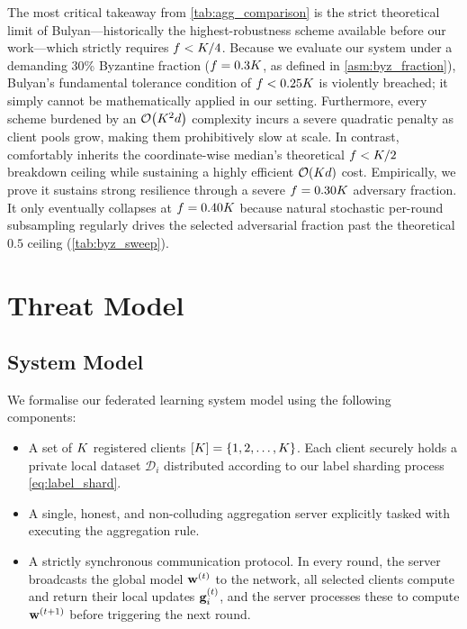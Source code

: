 \documentclass[../main]{subfiles}
\begin{document}
The most critical takeaway from \cref{tab:agg_comparison} is the strict theoretical limit of Bulyan---historically the highest-robustness scheme available before our work---which strictly requires $f < K/4$. Because we evaluate our system under a demanding 30\% Byzantine fraction ($f = 0.3K$, as defined in \cref{asm:byz_fraction}), Bulyan's fundamental tolerance condition of $f < 0.25K$ is violently breached; it simply cannot be mathematically applied in our setting. Furthermore, every scheme burdened by an $\mathcal{O}\!\left(K^2 d\right)$ complexity incurs a severe quadratic penalty as client pools grow, making them prohibitively slow at scale. In contrast, \aegis{} comfortably inherits the coordinate-wise median's theoretical $f < K/2$ breakdown ceiling while sustaining a highly efficient $\mathcal{O}\!\left(K d\right)$ cost. Empirically, we prove it sustains strong resilience through a severe $f = 0.30K$ adversary fraction. It only eventually collapses at $f = 0.40K$ because natural stochastic per-round subsampling regularly drives the selected adversarial fraction past the theoretical $0.5$ ceiling (\cref{tab:byz_sweep}).

\section{Threat Model}
\label{sec:threat_model}

\subsection{System Model}
\label{sec:sys_model}

We formalise our federated learning system model using the following components:
\begin{itemize}
    \item A set of $K$ registered clients $[K] = \{1, 2, \ldots, K\}$. Each client securely holds a private local dataset $\mathcal{D}_i$ distributed according to our label sharding process \eqref{eq:label_shard}.
    \item A single, honest, and non-colluding aggregation server explicitly tasked with executing the \aegis{} aggregation rule.
    \item A strictly synchronous communication protocol. In every round, the server broadcasts the global model $\mathbf{w}^{(t)}$ to the network, all selected clients compute and return their local updates $\mathbf{g}_{i}^{(t)}$, and the server processes these to compute $\mathbf{w}^{(t+1)}$ before triggering the next round.
\end{itemize}
\end{document}
